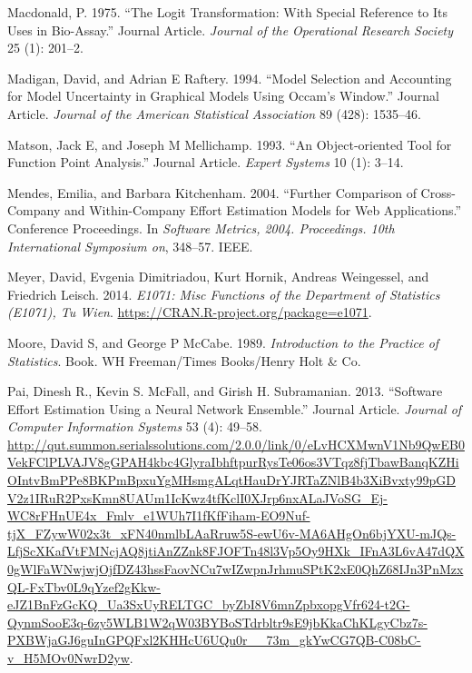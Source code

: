 \documentclass[]{elsarticle} %
\begin{document}
\hypertarget{ref-Macdonald1975}{}
Macdonald, P. 1975. ``The Logit Transformation: With Special Reference
to Its Uses in Bio-Assay.'' Journal Article. \emph{Journal of the
Operational Research Society} 25 (1): 201--2.

\hypertarget{ref-Madigan1994}{}
Madigan, David, and Adrian E Raftery. 1994. ``Model Selection and
Accounting for Model Uncertainty in Graphical Models Using Occam's
Window.'' Journal Article. \emph{Journal of the American Statistical
Association} 89 (428): 1535--46.

\hypertarget{ref-Matson1993}{}
Matson, Jack E, and Joseph M Mellichamp. 1993. ``An Object‐oriented Tool
for Function Point Analysis.'' Journal Article. \emph{Expert Systems} 10
(1): 3--14.

\hypertarget{ref-Mendes2004}{}
Mendes, Emilia, and Barbara Kitchenham. 2004. ``Further Comparison of
Cross-Company and Within-Company Effort Estimation Models for Web
Applications.'' Conference Proceedings. In \emph{Software Metrics, 2004.
Proceedings. 10th International Symposium on}, 348--57. IEEE.

\hypertarget{ref-e1071}{}
Meyer, David, Evgenia Dimitriadou, Kurt Hornik, Andreas Weingessel, and
Friedrich Leisch. 2014. \emph{E1071: Misc Functions of the Department of
Statistics (E1071), Tu Wien}.
\url{https://CRAN.R-project.org/package=e1071}.

\hypertarget{ref-Moore1989}{}
Moore, David S, and George P McCabe. 1989. \emph{Introduction to the
Practice of Statistics}. Book. WH Freeman/Times Books/Henry Holt \& Co.

\hypertarget{ref-Pai2013}{}
Pai, Dinesh R., Kevin S. McFall, and Girish H. Subramanian. 2013.
``Software Effort Estimation Using a Neural Network Ensemble.'' Journal
Article. \emph{Journal of Computer Information Systems} 53 (4): 49--58.
\url{http://qut.summon.serialssolutions.com/2.0.0/link/0/eLvHCXMwnV1Nb9QwEB0VekFClPLVAJV8gGPAH4kbc4GlyraIbhftpurRysTe06os3VTqz8fjTbawBanqKZHiOIntvBmPPe8BKPmBpxuYgMHsmgALqtHauDrYJRTaZNlB4b3XiBvxty99pGDV2z1IRuR2PxsKmn8UAUm1IcKwz4tfKclI0XJrp6nxALaJVoSG_Ej-WC8rFHnUE4x_Fmlv_e1WUh7I1fKfFiham-EO9Nuf-tjX_FZywW02x3t_xFN40nmlbLAaRruw5S-ewU6v-MA6AHgOn6bjYXU-mJQs-LfjScXKafVtFMNcjAQ8jtiAnZZnk8FJOFTn48l3Vp5Oy9HXk_IFnA3L6vA47dQX0gWlFaWNwjwjOjfDZ43hssFaovNCu7wIZwpnJrhmuSPtK2xE0QhZ68IJn3PnMzxQL-FxTbv0L9qYzef2gKkw-eJZ1BnFzGcKQ_Ua3SxUyRELTGC_byZbI8V6mnZpbxopgVfr624-t2G-QynmSooE3q-6zy5WLB1W2qW03BYBoSTdrbltr9sE9jbKkaChKLgyCbz7s-PXBWjaGJ6guInGPQFxl2KHHcU6UQu0r__73m_gkYwCG7QB-C08bC-v_H5MOv0NwrD2yw}.
\end{document}
